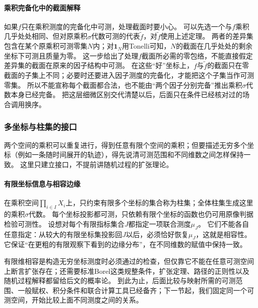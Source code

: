 \paragraph{乘积完备化中的截面解释}

如果$f$只在乘积测度的完备化中可测，处理截面时要小心。
可以先选一个与$f$乘积几乎处处相同、但对原乘积$\sigma$代数可测的代表$\widetilde f$，对$\widetilde f$使用上述定理。
两者的差异集包含在某个原乘积可测零集$N$内；对$\mathbf 1_N$用Tonelli可知，$N$的截面在几乎处处的剩余坐标下可测且质量为零。
这一步给出了处理$f$截面所必需的零包络，不能直接假定差异集的截面在原来的因子结构中可测。
在这些“好”坐标上，$f$与$\widetilde f$的截面只在零截面的子集上不同；必要时还要进入因子测度的完备化，才能把这个子集当作可测零集。
所以不能宣称每个截面都合法，也不能由“两个因子分别完备”推出乘积$\sigma$代数本身已经完备。
把这层细微区别交代清楚以后，后面只在条件已经核对过的场合调用换序。

\subsubsection{多坐标与柱集的接口}

两个空间的乘积可以重复进行，得到任意有限个空间的乘积；但要描述无穷多个坐标（例如一条随时间展开的轨迹），得先说清可测范围和不同维数之间怎样保持一致。
这里只建立接口，不提前讲随机过程的扩张理论。

\paragraph{有限坐标信息与相容边缘}

在乘积空间$\prod_{i\in I}X_i$上，只约束有限多个坐标的集合称为柱集；全体柱集生成这里的乘积$\sigma$代数。
每个坐标投影都可测，只依赖有限个坐标的函数也仍可用原像判据检验可测性。
设想对每个有限指标集合$J$都指定一项联合测度$\mu_J$。
它们不能各自任意指定：从较大的有限坐标集投影回$J$以后，必须恰好恢复$\mu_J$，这就是相容性。
它保证“在更粗的有限观察下看到的边缘分布”，在不同维数的赋值中保持一致。

有限维相容是构造无穷坐标测度时必须通过的检查，但仅靠它不能在任意可测空间上断言扩张存在；还需要标准Borel这类规整条件，扩张定理、路径的正则性以及随机过程解释都留给后文的概率论。
到此为止，后面比较与映射所需的可测范围、一般赋权、积分条件和联合计算工具已经备齐；下一节起，我们固定同一个可测空间，开始比较上面不同测度之间的关系。
